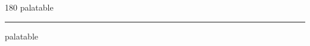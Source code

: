 
\begin{frame}
\begin{center}
\begin{turn}{180}
{\fontsize{2.5cm}{1em}\selectfont palatable}
\end{turn}
\vspace{1em}\par  
\hrule
\vspace{1em}\par  
{\fontsize{2.5cm}{1em}\selectfont palatable}
\end{center}
\end{frame}
